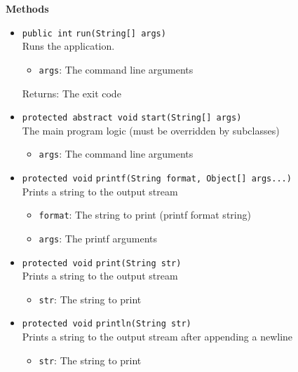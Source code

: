 \textbf{Methods}
\begin{itemize}
\item \lstinline|public int| \lstinline|run|\lstinline|(String[] args)|\\
Runs the application.
\begin{itemize}
\item \lstinline|args|: The command line arguments
\end{itemize}

Returns: The exit code

\item \lstinline|protected abstract void| \lstinline|start|\lstinline|(String[] args)|\\
The main program logic (must be overridden by subclasses)
\begin{itemize}
\item \lstinline|args|: The command line arguments
\end{itemize}



\item \lstinline|protected void| \lstinline|printf|\lstinline|(String format, Object[] args...)|\\
Prints a string to the output stream
\begin{itemize}
\item \lstinline|format|: The string to print (printf format string)
\item \lstinline|args|: The printf arguments
\end{itemize}



\item \lstinline|protected void| \lstinline|print|\lstinline|(String str)|\\
Prints a string to the output stream
\begin{itemize}
\item \lstinline|str|: The string to print
\end{itemize}



\item \lstinline|protected void| \lstinline|println|\lstinline|(String str)|\\
Prints a string to the output stream after appending a newline
\begin{itemize}
\item \lstinline|str|: The string to print
\end{itemize}




\end{itemize}
